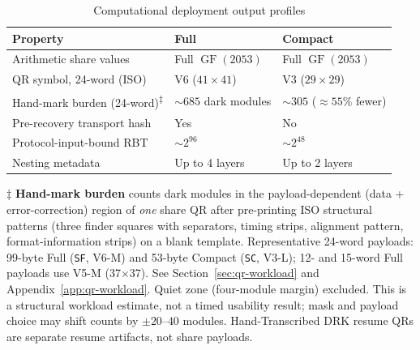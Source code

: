 \documentclass[11pt]{article}
\newcommand{\GF}{\operatorname{GF}}
\begin{document}
\begin{table}[ht!]
\centering
\caption{Computational deployment output profiles}
\label{tab:modes}
\footnotesize
\setlength{\tabcolsep}{3pt}
\begin{tabular}{@{}>{\raggedright\arraybackslash}p{}>{\centering\arraybackslash}p{}>{\centering\arraybackslash}p{}@{}}
\toprule
\textbf{Property} & \textbf{Full} & \textbf{Compact} \\ \midrule
Arithmetic share values & Full $\GF(2053)$ & Full $\GF(2053)$ \\
QR symbol, 24-word (ISO) & V6 ($41\times 41$) & V3 ($29\times 29$) \\
Hand-mark burden (24-word)\textsuperscript{$\ddagger$} & ${\sim}685$ dark modules & ${\sim}305$ (${\approx}55\%$ fewer) \\
Pre-recovery transport hash & Yes & No \\
Protocol-input-bound RBT & ${\sim}2^{96}$ & ${\sim}2^{48}$ \\
Nesting metadata & Up to 4 layers & Up to 2 layers \\
\bottomrule
\end{tabular}

\medskip
\footnotesize
$\ddagger$ \textbf{Hand-mark burden} counts dark modules in the payload-dependent (data + error-correction) region of \emph{one} share QR after pre-printing ISO structural patterns (three finder squares with separators, timing strips, alignment pattern, format-information strips) on a blank template. Representative 24-word payloads: 99-byte Full (\texttt{SF}, V6-M) and 53-byte Compact (\texttt{SC}, V3-L); 12- and 15-word Full payloads use V5-M (37$\times$37). See Section~\ref{sec:qr-workload} and Appendix~\ref{app:qr-workload}. Quiet zone (four-module margin) excluded. This is a structural workload estimate, not a timed usability result; mask and payload choice may shift counts by $\pm 20$--$40$ modules. Hand-Transcribed DRK resume QRs are separate resume artifacts, not share payloads.
\end{table}
\end{document}
